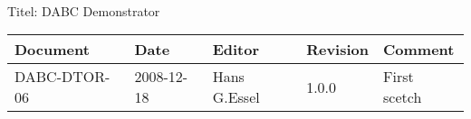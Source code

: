 \\Titel: DABC Demonstrator
\begin{table}[h]
\begin{tabular}{|p{2.8cm}|p{2.0cm}|p{3.0cm}|p{1.6cm}|p{5.0cm}|} \hline
Document   & Date        & Editor       & Revision & Comment \\
\hline DABC-DTOR-06 & 2008-12-18 & Hans G.Essel & 1.0.0      &
First scetch \\ \hline
\end{tabular}
\end{table}
